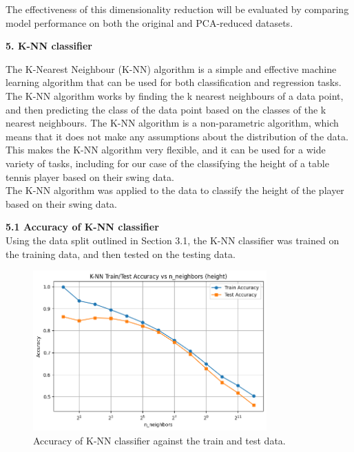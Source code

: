 \documentclass[12pt]{article}
\begin{document}
The effectiveness of this dimensionality reduction will be evaluated by comparing model performance on both the original and PCA-reduced datasets.

\vspace{20pt}

\textbf{5. K-NN classifier}

The K-Nearest Neighbour (K-NN) algorithm is a simple and effective machine learning algorithm that can be used for both classification and regression tasks. The K-NN algorithm works by finding the k nearest neighbours of a data point, and then predicting the class of the data point based on the classes of the k nearest neighbours. The K-NN algorithm is a non-parametric algorithm, which means that it does not make any assumptions about the distribution of the data. This makes the K-NN algorithm very flexible, and it can be used for a wide variety of tasks, including for our case of the classifying the height of a table tennis player based on their swing data.
\\
The K-NN algorithm was applied to the data to classify the height of the player based on their swing data.


\vspace{20pt}


\textbf{5.1 Accuracy of K-NN classifier}
\\
Using the data split outlined in Section 3.1, the K-NN classifier was trained on the training data, and then tested on the testing data. 

\begin{figure}[H]
\centering
\includegraphics[width=0.8\textwidth]{figures/knn_accuracy.png}
\caption{Accuracy of K-NN classifier against the train and test data.}
\label{fig:knn_accuracy}
\end{figure}
\end{document}
